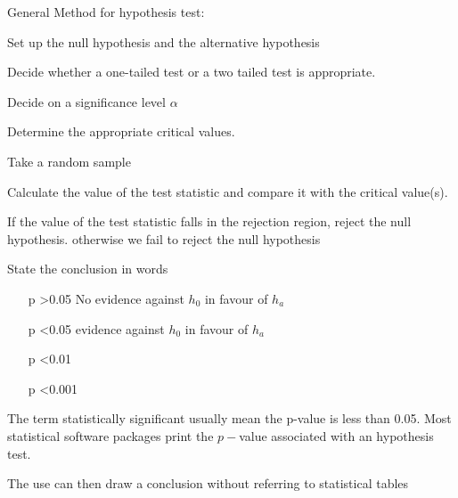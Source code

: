 General Method for hypothesis test:

Set up the null hypothesis and the alternative hypothesis

Decide whether a one-tailed test or a two tailed test is appropriate.

Decide on a significance level $\alpha$

Determine the appropriate critical values.

Take a random sample

Calculate the value of the test statistic and compare it with the critical value(s).

If the value of the test statistic falls in the rejection region, reject the null hypothesis. otherwise we fail to reject the null hypothesis

State the conclusion in words



\begin{itemize}

\item[p >0.05] No evidence against $h_0$ in favour of $h_a$

\item[p <0.05] evidence against $h_0$ in favour of $h_a$

\item[p <0.01]

\item[p <0.001]

\end{itemize}


The term statistically significant usually mean the p-value is less than 0.05.
Most statistical software packages print the $p-$value associated with an hypothesis test.

The use can then draw a conclusion without referring to statistical tables

